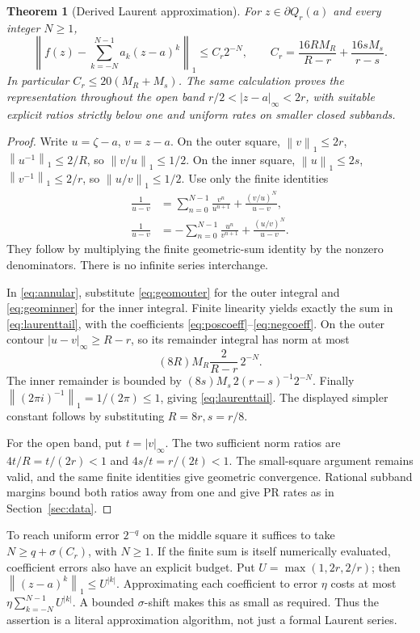 \documentclass[11pt]{article}
\newtheorem{theorem}{Theorem}[section]
\theoremstyle{definition}
\newcommand{\norm}[1]{\left\lVert#1\right\rVert_1}
\newcommand{\bd}{\partial}
\begin{document}
\begin{theorem}[Derived Laurent approximation]\label{thm:laurent}
For \(z\in\bd Q_r(a)\) and every integer \(N\ge1\),
\begin{equation}\label{eq:laurenttail}
 \boxed{\quad
 \norm{f(z)-\sum_{k=-N}^{N-1}a_k(z-a)^k}
 \le C_r2^{-N},\qquad
 C_r=\frac{16RM_R}{R-r}+\frac{16sM_s}{r-s}.
 \quad}
\end{equation}
In particular \(C_r\le20(M_R+M_s)\). The same calculation proves
the representation throughout the open band
\(r/2<|z-a|_\infty<2r\), with suitable explicit ratios strictly below
one and uniform rates on smaller closed subbands.
\end{theorem}
\begin{proof}
Write \(u=\zeta-a\), \(v=z-a\). On the outer square,
\(\norm v\le2r\), \(\norm{u^{-1}}\le2/R\), so
\(\norm{v/u}\le1/2\). On the inner square,
\(\norm u\le2s\), \(\norm{v^{-1}}\le2/r\), so
\(\norm{u/v}\le1/2\). Use only the finite identities
\begin{align}
 \frac1{u-v}
   &=\sum_{n=0}^{N-1}\frac{v^n}{u^{n+1}}
          +\frac{(v/u)^N}{u-v},\label{eq:geomouter}\\
 \frac1{u-v}
   &=-\sum_{n=0}^{N-1}\frac{u^n}{v^{n+1}}
          +\frac{(u/v)^N}{u-v}.\label{eq:geominner}
\end{align}
They follow by multiplying the finite geometric-sum identity by the
nonzero denominators. There is no infinite series interchange.

In \eqref{eq:annular}, substitute \eqref{eq:geomouter} for the outer
integral and \eqref{eq:geominner} for the inner integral. Finite
linearity yields exactly the sum in \eqref{eq:laurenttail}, with the
coefficients \eqref{eq:poscoeff}--\eqref{eq:negcoeff}.
On the outer contour \(|u-v|_\infty\ge R-r\), so its remainder integral
has norm at most
\[
 (8R)M_R\frac{2}{R-r}\,2^{-N}.
\]
The inner remainder is bounded by
\((8s)M_s\,2(r-s)^{-1}2^{-N}\).
Finally \(\norm{(2\pi i)^{-1}}=1/(2\pi)\le1\), giving
\eqref{eq:laurenttail}. The displayed simpler constant follows by
substituting \(R=8r,s=r/8\).

For the open band, put \(t=|v|_\infty\). The two sufficient norm ratios
are \(4t/R=t/(2r)<1\) and \(4s/t=r/(2t)<1\).
The small-square argument remains valid, and the same finite identities
give geometric convergence. Rational subband margins bound both ratios
away from one and give PR rates as in Section~\ref{sec:data}.
\end{proof}

To reach uniform error \(2^{-q}\) on the middle square it suffices to
take \(N\ge q+\sigma(C_r)\), with \(N\ge1\). If the finite sum is itself
numerically evaluated, coefficient errors also have an explicit budget.
Put \(U=\max(1,2r,2/r)\); then
\(\norm{(z-a)^k}\le U^{|k|}\). Approximating each coefficient to error
\(\eta\) costs at most
\(\eta\sum_{k=-N}^{N-1}U^{|k|}\). A bounded \(\sigma\)-shift makes this
as small as required. Thus the assertion is a literal approximation
algorithm, not just a formal Laurent series.
\end{document}
